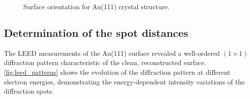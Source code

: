 \documentclass[fontsize=11pt,reqno,a4paper,oneside]{scrartcl}
\begin{document}
\begin{figure}[H]
    \centering
    \hfill
    
    \caption{Surface orientation for Au(111) crystal structure.}
    \label{fig:surface_orientations}
\end{figure}

\subsection{Determination of the spot distances}
The \ac{LEED} measurements of the Au(111) surface revealed a well-ordered $(1 \times 1)$ diffraction pattern characteristic of the clean, reconstructed surface. \autoref{fig:leed_patterns} shows the evolution of the diffraction pattern at different electron energies, demonstrating the energy-dependent intensity variations of the diffraction spots.
\end{document}
